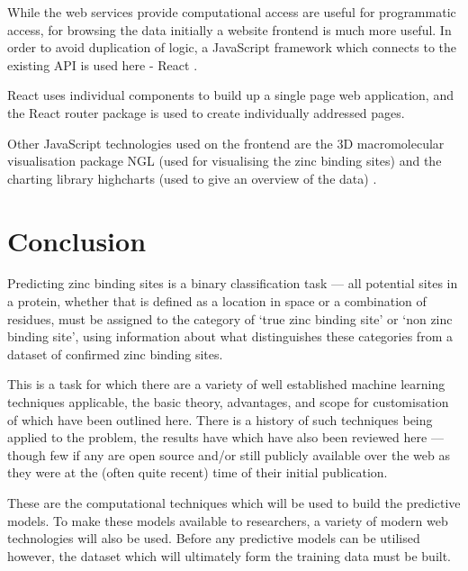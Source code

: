 While the web services provide computational access are useful for programmatic access, for browsing the data initially a website frontend is much more useful. In order to avoid duplication of logic, a JavaScript framework which connects to the existing API is used here - React \cite{react}.

React uses individual components to build up a single page web application, and the React router package is used to create individually addressed pages.

Other JavaScript technologies used on the frontend are the 3D macromolecular visualisation package NGL (used for visualising the zinc binding sites) \cite{rose2015ngl} and the charting library highcharts (used to give an overview of the data) \cite{highcharts}.

\section{Conclusion}

Predicting zinc binding sites is a binary classification task --- all potential sites in a protein, whether that is defined as a location in space or a combination of residues, must be assigned to the category of `true zinc binding site' or `non zinc binding site', using information about what distinguishes these categories from a dataset of confirmed zinc binding sites.

This is a task for which there are a variety of well established machine learning techniques applicable, the basic theory, advantages, and scope for customisation of which have been outlined here. There is a history of such techniques being applied to the problem, the results have which have also been reviewed here --- though few if any are open source and/or still publicly available over the web as they were at the (often quite recent) time of their initial publication.

These are the computational techniques which will be used to build the predictive models. To make these models available to researchers, a variety of modern web technologies will also be used. Before any predictive models can be utilised however, the dataset which will ultimately form the training data must be built.